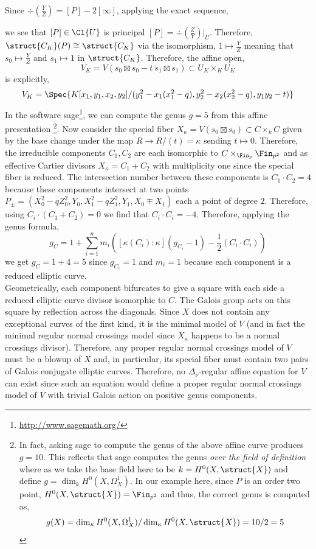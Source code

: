 Since $\div{(\frac{Y}{Z})} = [P] - 2 [\infty]$, applying the exact sequence,
\begin{center}
\end{center}
we see that $[P] \in \Cl{U}$ is principal $[P] = \div{(\frac{Z}{Y})}|_U$. Therefore, $\struct{C_K}(P) \cong \struct{C_K}$ via the isomorphism, $1 \mapsto \frac{Y}{Z}$ meaning that $s_0 \mapsto \frac{Y}{Z}$ and $s_1 \mapsto 1$ in $\struct{C_K}$. Therefore, the affine open,
\[ V_K = V(s_0 \boxtimes s_0 - t \: s_1 \boxtimes s_1) \subset U_K \times_K U_K \]
is explicitly,
\[ V_K = \Spec{K[x_1, y_1, x_2, y_2]/(y_1^2 - x_1(x_1^2 - q), y_2^2 - x_2(x_2^2 - q), y_1 y_2 - t)} \]
In the software sage\footnote{\url{http://www.sagemath.org/}}, we can compute the genus $g = 5$ from this affine presentation \footnote{In fact, asking sage to compute the genus of the above affine curve produces $g = 10$. This reflects that sage computes the genus \textit{over the field of definition} where as we take the base field here to be $k = H^0(X, \struct{X})$ and define $g = \dim_k H^0(X, \Omega^1_X)$. In our example here, since $P$ is an order two point, $H^0(X, \struct{X}) = \Fin_{p^2}$ and thus, the correct genus is computed as,
\[ g(X) = \dim_\kappa H^0(X, \Omega^1_X) / \dim_\kappa H^0(X, \struct{X}) = 10/2 = 5 \]}.
Now consider the special fiber $X_\kappa = V(s_0 \boxtimes s_0) \subset C \times_k C$ given by the base change under the map $R \to R/(t) = \kappa$ sending $t \mapsto 0$. Therefore, the irreducible components $C_1, C_2$ are each isomorphic to $C \times_{\Fin_p} \Fin_{p^2}$ and as effective Cartier divisors $X_\kappa = C_1 + C_2$ with multiplicity one since the special fiber is reduced. The intersection number between these components is $C_1 \cdot C_2 = 4$ because these components intersect at two points $P_{\pm} = (X_0^2 - q Z_0^2, Y_0, X_1^2 - q Z_1^2, Y_1, X_0 \mp X_1)$ each a point of degree $2$. Therefore, using $C_i \cdot (C_1 + C_2) = 0$ we find that $C_i \cdot C_i = -4$. Therefore, applying the genus formula,
\[ g_C = 1 + \sum_{i = 1}^n m_i \left( [\kappa(C_i) : \kappa] (g_{C_i} - 1) - \frac{1}{2} (C_i \cdot C_i) \right) \]
we get $g_C = 1 + 4 = 5$ since $g_{C_i} = 1$ and $m_i = 1$ because each component is a reduced elliptic curve. 
\bigskip\\
Geometrically, each component bifurcates to give a square with each side a reduced elliptic curve divisor isomorphic to $C$. The Galois group acts on this square by reflection across the diagonals. Since $X$ does not contain any exceptional curves of the first kind, it is the minimal model of $V$ (and in fact the minimal regular normal crossings model since $X_\kappa$ happens to be a normal crossings divisor). Therefore, any proper regular normal crossings model of $V$ must be a blowup of $X$ and, in particular, its special fiber must contain two pairs of Galois conjugate elliptic curves. Therefore, no $\Delta_\nu$-regular affine equation for $V$ can exist since such an equation would define a proper regular normal crossings model of $V$ with trivial Galois action on positive genus components. 